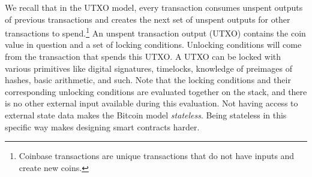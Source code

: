 We recall that in the UTXO model, every transaction consumes unspent outputs of previous transactions and creates the next set of unspent outputs for other transactions to spend.\footnote{Coinbase transactions are unique transactions that do not have inputs and create new coins.} An unspent transaction output (UTXO) contains the coin value in question and a set of locking conditions. Unlocking conditions will come from the transaction that spends this UTXO. A UTXO can be locked with various primitives like digital signatures, timelocks, knowledge of preimages of hashes, basic arithmetic, and such. Note that the locking conditions and their corresponding unlocking conditions are evaluated together on the stack, and there is no other external input available during this evaluation. Not having access to external state data makes the Bitcoin model \textit{stateless}. Being stateless in this specific way makes designing smart contracts harder.

